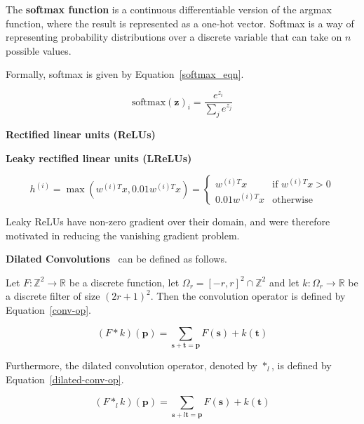 \documentclass[a4paper, 12pt]{article}
\newcommand\phantomlabel[1]{\phantomsection\label{#1}}
\begin{document}
The \textbf{softmax function} is a continuous differentiable version of the
argmax function, where the result is represented as a one-hot
vector\citet[Chapter~6]{Goodfellow-et-al-2016-Book}. Softmax is a way of
representing probability distributions over a discrete variable that can take
on $n$ possible values.

Formally, softmax is given by Equation~\ref{softmax_eqn}.

\begin{equation}
        \textrm{softmax}{(\boldsymbol{z})}_i = \frac{e^{z_i}}{\sum_je^{z_j}}
        \label{softmax_eqn}
\end{equation}


\phantomlabel{rectified_linear_units}
\textbf{Rectified linear units (ReLUs)}\citet{icml2010_NairH10}


\textbf{Leaky rectified linear units (LReLUs)}\citet{maas_rectified_nonlinearities}

\begin{equation}
        h^{(i)} = \max\left(w^{(i)T}x, 0.01w^{(i)T}x\right) =
        \begin{cases}
                w^{(i)T}x & \textrm{if } w^{(i)T}x > 0 \\
                0.01w^{(i)T}x & \textrm{otherwise}
        \end{cases}
\end{equation}

Leaky ReLUs have non-zero gradient over their domain, and were therefore
motivated in reducing the vanishing gradient problem.


\phantomlabel{dilated_convolutions}
\textbf{Dilated Convolutions}~\citet{DBLP:journals/corr/YuK15} can be defined as
follows.

Let $F: \mathbb{Z}^2 \rightarrow \mathbb{R}$ be a discrete
function, let $\Omega_r = {[-r, r]}^2 \cap \mathbb{Z}^2$ and let
$k: \Omega_r \rightarrow \mathbb{R}$ be a discrete filter of size
${(2r + 1)}^2$. Then the convolution operator is defined by
Equation~\ref{conv-op}.

\begin{equation}
        (F * k)(\mathbf{p}) = \sum_{\mathbf{s} + \mathbf{t} = \mathbf{p}} F(\mathbf{s}) + k(\mathbf{t})
        \label{conv-op}
\end{equation}

Furthermore, the dilated convolution operator, denoted by $*_l$, is defined by
Equation~\ref{dilated-conv-op}.

\begin{equation}
        (F *_l k)(\mathbf{p}) = \sum_{\mathbf{s} + l\mathbf{t} = \mathbf{p}} F(\mathbf{s}) + k(\mathbf{t})
        \label{dilated-conv-op}
\end{equation}
\end{document}
